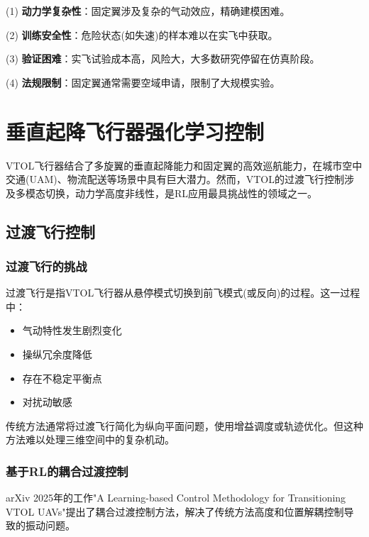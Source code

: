 \documentclass[12pt,a4paper]{ctexart}
\begin{document}
(1) \textbf{动力学复杂性}：固定翼涉及复杂的气动效应，精确建模困难。

(2) \textbf{训练安全性}：危险状态(如失速)的样本难以在实飞中获取。

(3) \textbf{验证困难}：实飞试验成本高，风险大，大多数研究停留在仿真阶段。

(4) \textbf{法规限制}：固定翼通常需要空域申请，限制了大规模实验。


\section{垂直起降飞行器强化学习控制}\label{sec:vtol}

VTOL飞行器结合了多旋翼的垂直起降能力和固定翼的高效巡航能力，在城市空中交通(UAM)、物流配送等场景中具有巨大潜力。然而，VTOL的过渡飞行控制涉及多模态切换，动力学高度非线性，是RL应用最具挑战性的领域之一。

\subsection{过渡飞行控制}

\subsubsection{过渡飞行的挑战}

过渡飞行是指VTOL飞行器从悬停模式切换到前飞模式(或反向)的过程。这一过程中：
\begin{itemize}
    \item 气动特性发生剧烈变化
    \item 操纵冗余度降低
    \item 存在不稳定平衡点
    \item 对扰动敏感
\end{itemize}

传统方法通常将过渡飞行简化为纵向平面问题，使用增益调度或轨迹优化。但这种方法难以处理三维空间中的复杂机动。

\subsubsection{基于RL的耦合过渡控制}

arXiv 2025年的工作"A Learning-based Control Methodology for Transitioning VTOL UAVs"提出了耦合过渡控制方法，解决了传统方法高度和位置解耦控制导致的振动问题。
\end{document}
